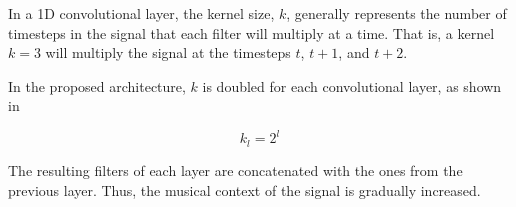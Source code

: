
In a 1D convolutional layer, the kernel size, $k$, generally
represents the number of timesteps in the signal that each
filter will multiply at a time. That is, a kernel $k=3$ will
multiply the signal at the timesteps $t$, $t+1$, and $t+2$.

In the proposed architecture, $k$ is doubled for each
convolutional layer, as shown in 

\begin{equation}
    \label{eq:kernel_size}
    k_l = 2^{l}
\end{equation}

The resulting filters of each layer are concatenated with
the ones from the previous layer. Thus, the musical context
of the signal is gradually increased.
